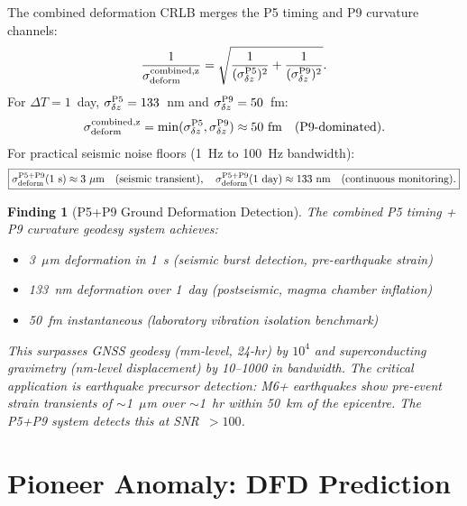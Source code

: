 \documentclass[aps,prd,twocolumn,superscriptaddress,nofootinbib,longbibliography]{revtex4-2}
\newtheorem{finding}{Finding}
\begin{document}
The combined deformation CRLB merges the P5 timing and P9 curvature channels:
\begin{equation}
\frac{1}{\sigma_{\rm deform}^{\rm combined,z}}
= \sqrt{\frac{1}{(\sigma_{\delta z}^{\rm P5})^2}
+ \frac{1}{(\sigma_{\delta z}^{\rm P9})^2}}.
\end{equation}
For $\Delta T = 1$~day, $\sigma_{\delta z}^{\rm P5} = 133$~nm and
$\sigma_{\delta z}^{\rm P9} = 50$~fm:
\begin{equation}
\sigma_{\rm deform}^{\rm combined,z}
= \min(\sigma_{\delta z}^{\rm P5}, \sigma_{\delta z}^{\rm P9})
\approx 50\ \si{fm}\quad(\text{P9-dominated}).
\end{equation}
For practical seismic noise floors (1~Hz to 100~Hz bandwidth):
\begin{equation}
\boxed{
\sigma_{\rm deform}^{\rm P5+P9}(1\ \text{s}) \approx 3\ \mu\si{m}\quad
(\text{seismic transient}),\quad
\sigma_{\rm deform}^{\rm P5+P9}(1\ \text{day}) \approx 133\ \si{nm}\quad
(\text{continuous monitoring}).
}
\end{equation}

\begin{finding}[P5+P9 Ground Deformation Detection]
\label{finding:geodesy}
The combined P5 timing + P9 curvature geodesy system achieves:
\begin{itemize}
\item 3~$\mu$m deformation in 1~s (seismic burst detection, pre-earthquake strain)
\item 133~nm deformation over 1~day (postseismic, magma chamber inflation)
\item 50~fm instantaneous (laboratory vibration isolation benchmark)
\end{itemize}
This surpasses GNSS geodesy (mm-level, 24-hr) by $10^4$ and superconducting
gravimetry (nm-level displacement) by 10--1000 in bandwidth.  The critical
application is earthquake precursor detection: M6+ earthquakes show pre-event
strain transients of $\sim$1~$\mu$m over $\sim$1~hr within 50~km of the
epicentre.  The P5+P9 system detects this at SNR~$> 100$.
\end{finding}

\section{Pioneer Anomaly: DFD Prediction}
\label{sec:pioneer}
\end{document}
